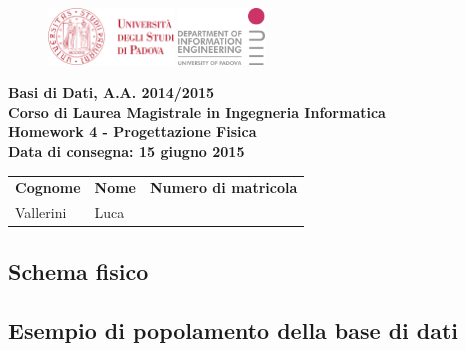 \documentclass[a4paper]{scrartcl}
\newcommand{\corso}{Basi di Dati}
\newcommand{\anac}{A.A. 2014/2015}
\newcommand{\laurea}{Corso di Laurea Magistrale in Ingegneria Informatica}
\newcommand{\matricola}{1110975}
\newcommand{\nome}{Luca}
\newcommand{\cognome}{Vallerini}
\newcommand{\data}{Data di consegna: 15 giugno 2015}
\newcommand{\consegna}{Homework 4 - Progettazione Fisica}
\begin{document}
\begin{figure}
	\begin{minipage}[t]{\textwidth}
		\includegraphics[height=15mm]{img/logounipd}
		\hfill
		\includegraphics[height=15mm]{img/logodei}
	\end{minipage}
\end{figure}

{
\centering
\textbf{\corso , \anac} \\
\textbf{\laurea} \\
\vspace{5pt}
\textbf{\consegna} \\
\textbf{\small\data}


\begin{table}[h]
	\begin{tabularx}{\textwidth}{|X|X|X|}
		\hline
		\multicolumn{1}{|c|}{\textbf{Cognome}} &
		\multicolumn{1}{c|}{\textbf{Nome}} &
		\multicolumn{1}{c|}{\textbf{Numero di matricola}} \\
		\centering\cognome &
		\centering\nome &
		\centering\matricola \tabularnewline
		\hline
	\end{tabularx}
\end{table}

}	

\subsection*{\color[RGB]{155,0,20}Schema fisico}


\subsection*{\color[RGB]{155,0,20}Esempio di popolamento della base di dati}

\end{document}
